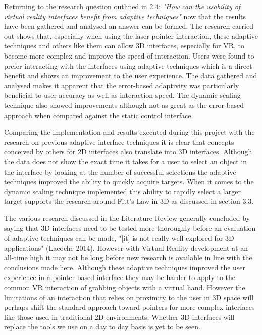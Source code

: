 \documentclass[12pt]{article}
\begin{document}
Returning to the research question outlined in 2.4: \emph{"How can the usability of virtual reality interfaces benefit from adaptive techniques"} now that the results have been gathered and analysed an answer can be formed. The research carried out shows that, especially when using the laser pointer interaction, these adaptive techniques and others like them can allow 3D interfaces, especially for VR, to become more complex and improve the speed of interaction. Users were found to prefer interacting with the interfaces using adaptive techniques which is a direct benefit and shows an improvement to the user experience. The data gathered and analysed makes it apparent that the error-based adaptivity was particularly beneficial to user accuracy as well as interaction speed. The dynamic scaling technique also showed improvements although not as great as the error-based approach when compared against the static control interface.

Comparing the implementation and results executed during this project with the research on previous adaptive interface techniques it is clear that concepts conceived by others for 2D interfaces also translate into 3D interfaces. Although the data does not show the exact time it takes for a user to select an object in the interface by looking at the number of successful selections the adaptive techniques improved the ability to quickly acquire targets. When it comes to the dynamic scaling technique implemented this ability to rapidly select a larger target supports the research around Fitt's Law in 3D as discussed in section 3.3.

The various research discussed in the Literature Review generally concluded by saying that 3D interfaces need to be tested more thoroughly before an evaluation of adaptive techniques can be made, "[it] is not really well explored for 3D applications" (Lacoche 2014). However with Virtual Reality development at an all-time high it may not be long before new research is available in line with the conclusions made here. Although these adaptive techniques improved the user experience in a pointer based interface they may be harder to apply to the common VR interaction of grabbing objects with a virtual hand. However the limitations of an interaction that relies on proximity to the user in 3D space will perhaps shift the standard approach toward pointers for more complex interfaces like those used in traditional 2D environments. Whether 3D interfaces will replace the tools we use on a day to day basis is yet to be seen.
\end{document}
